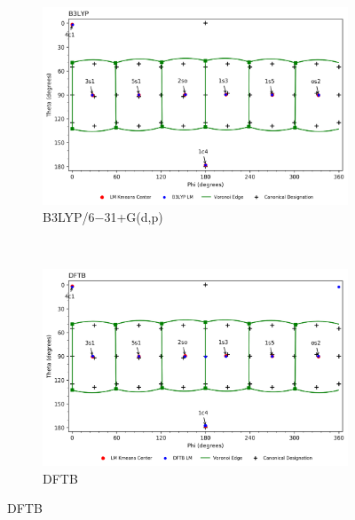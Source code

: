 \documentclass{article}
\begin{document}
\begin{figure}[H]
	\centering
   	\begin{subfigure}[b]{0.49\textwidth}
   	\includegraphics[width=1\textwidth,keepaspectratio]
   	{figures/oxane/overall/z_dataset-oxane-LM-B3LYP-all_groupings.png}
   	\caption{B3LYP/6$-$31+G(d,p)}
	\end{subfigure}
	~
	\begin{subfigure}[b]{0.49\textwidth}
	\includegraphics[width=1\textwidth,keepaspectratio]
   	{figures/oxane/overall/z_dataset-oxane-LM-DFTB-all_groupings.png}
	\caption{DFTB}
	\end{subfigure}
\end{figure}
\end{document}
